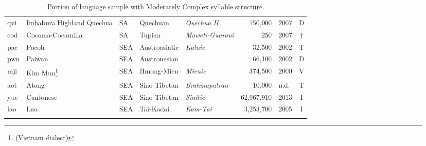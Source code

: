 \begin{table}
\begin{tabularx}{\textwidth}{lQlQQrlc}
 qvi & {{Imbabura Highland Quechua}} &  SA & {Quechuan} & {\textit{Quechua II}} &  150,000 & 2007 & D\\
 cod & {{Cocama-Cocamilla}} &  SA & {Tupian} & {\textit{Maweti-Guarani}} &  250 & 2007 & †\\
 pac & {{Pacoh}} &  SEA  & {Austroasiatic} & {\textit{Katuic}} &  32,500 & 2002 & T\\
 pwn & {{Paiwan}} &  SEA  & {Austronesian} &  &  66,100 & 2002 & D\\
 mji & {{{Kim Mun}\footnote{(Vietnam dialect)}}} &  SEA  & {Hmong-Mien} & {\textit{Mienic}} &  374,500 & 2000 & V\\
 aot & {{Atong}} &  SEA  & {Sino-Tibetan} & {\textit{Brahmaputran}} &  10,000 & n.d. & T\\
 yue & {{Cantonese}} &  SEA  & {Sino-Tibetan} & {\textit{Sinitic}} &  62,967,910 & 2013 & I\\
 lao & {{Lao}} &  SEA  & {Tai-Kadai} & {\textit{Kam-Tai}} &  3,253,700 & 2005 & I\\
\lspbottomrule
\end{tabularx}
\caption{Portion of language sample with Moderately Complex syllable structure.\label{tab:A.2}}
\end{table}


